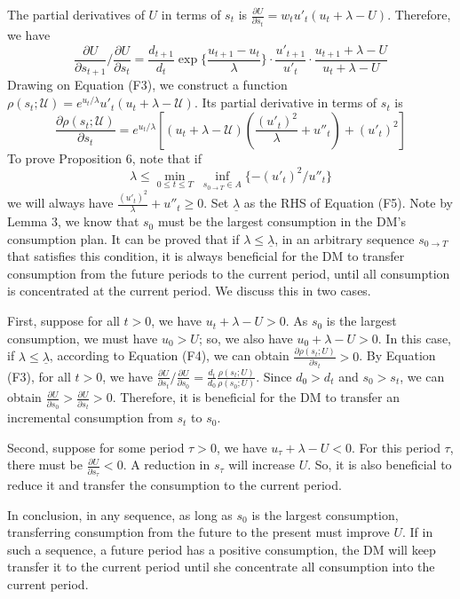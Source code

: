\documentclass[
  12pt,
]{article}
\begin{document}
The partial derivatives of \(U\) in terms of \(s_t\) is
\(\frac{\partial U}{\partial s_t}=w_tu'_t(u_t+\lambda-U)\). Therefore,
we have \[\tag{F3}
\frac{\partial U}{\partial s_{t+1}}/\frac{\partial U}{\partial s_t} = 
\frac{d_{t+1}}{d_t} \exp\{\frac{u_{t+1}-u_t}{\lambda}\}
\cdot\frac{u'_{t+1}}{u'_t}
\cdot\frac{u_{t+1}+\lambda-U}{u_t+\lambda-U}
\]Drawing on Equation (F3), we construct a function
\(\rho(s_t;\mathcal{U})=e^{u_t/\lambda}u'_t(u_t+\lambda-\mathcal{U})\).
Its partial derivative in terms of \(s_t\) is\[\tag{F4}
\frac{\partial \rho(s_t;\mathcal{U})}{\partial s_t} = 
e^{u_t/\lambda}[
(u_t+\lambda-\mathcal{U})(\frac{(u'_t)^2}{\lambda}+u''_t)
+(u'_t)^2]
\]To prove Proposition 6, note that if\[\tag{F5}
\lambda\leq \min_{0 \leq t \leq T} \;\inf_{s_{0\rightarrow T}\in A}\{-(u'_t)^2/u''_t\}
\]we will always have \(\frac{(u'_t)^2}{\lambda}+u''_t \geq 0\). Set
\(\underline{\lambda}\) as the RHS of Equation (F5). Note by Lemma 3, we
know that \(s_0\) must be the largest consumption in the DM's
consumption plan. It can be proved that if
\(\lambda\leq \underline{\lambda}\), in an arbitrary sequence
\(s_{0\rightarrow T}\) that satisfies this condition, it is always
beneficial for the DM to transfer consumption from the future periods to
the current period, until all consumption is concentrated at the current
period. We discuss this in two cases.

First, suppose for all \(t>0\), we have \(u_t+\lambda -U>0\). As \(s_0\)
is the largest consumption, we must have \(u_0>U\); so, we also have
\(u_0+\lambda-U>0\). In this case, if
\(\lambda\leq \underline{\lambda}\), according to Equation (F4), we can
obtain \(\frac{\partial \rho(s_t;U)}{\partial s_t}>0\). By Equation
(F3), for all \(t>0\), we have
\(\frac{\partial U}{\partial s_t}/\frac{\partial U}{\partial s_0}=\frac{d_{t}}{d_0} \frac{\rho(s_t;U)}{\rho(s_0;U)}\).
Since \(d_0>d_t\) and \(s_0>s_t\), we can obtain
\(\frac{\partial U}{\partial s_0}>\frac{\partial U}{\partial s_t}>0\).
Therefore, it is beneficial for the DM to transfer an incremental
consumption from \(s_t\) to \(s_0\).

Second, suppose for some period \(\tau>0\), we have
\(u_\tau+\lambda-U< 0\). For this period \(\tau\), there must be
\(\frac{\partial U}{\partial s_\tau}<0\). A reduction in \(s_\tau\) will
increase \(U\). So, it is also beneficial to reduce it and transfer the
consumption to the current period.

In conclusion, in any sequence, as long as \(s_0\) is the largest
consumption, transferring consumption from the future to the present
must improve \(U\). If in such a sequence, a future period has a
positive consumption, the DM will keep transfer it to the current period
until she concentrate all consumption into the current period.
\end{document}
